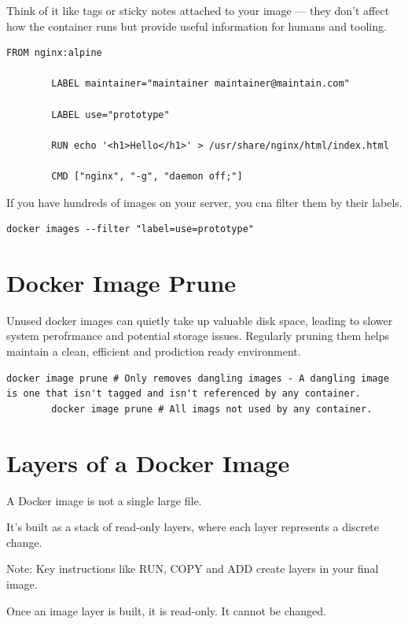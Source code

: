 \documentclass[11pt]{book}
\begin{document}
    Think of it like tags or sticky notes attached to your image --- they don't affect how the container runs but provide useful information for humans and tooling.

    \begin{lstlisting}[style=dockerstyle,caption={Example Dockerfile}]
        FROM nginx:alpine

        LABEL maintainer="maintainer maintainer@maintain.com"

        LABEL use="prototype"

        RUN echo '<h1>Hello</h1>' > /usr/share/nginx/html/index.html

        CMD ["nginx", "-g", "daemon off;"]
    \end{lstlisting}

    If you have hundreds of images on your server, you cna filter them by their labels.

    \begin{lstlisting}[style=terminal]
        docker images --filter "label=use=prototype"
    \end{lstlisting}

    \section{Docker Image Prune}
    Unused docker images can quietly take up valuable disk space, leading to slower system perofrmance and potential storage issues.
    Regularly pruning them helps maintain a clean, efficient and prodiction ready environment.


    \begin{lstlisting}[style=terminal]
        docker image prune # Only removes dangling images - A dangling image is one that isn't tagged and isn't referenced by any container.
        docker image prune # All imags not used by any container.
    \end{lstlisting}

    \section{Layers of a Docker Image}
    A Docker image is not a single large file.

    It's built as a stack of read-only layers, where each layer represents a discrete change.

    Note:
    Key instructions like RUN, COPY and ADD create layers in your final image.

    Once an image layer is built, it is read-only. It cannot be changed.
\end{document}
